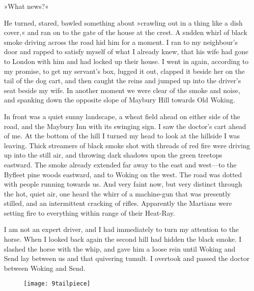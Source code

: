 »What news?«

He turned, stared, bawled something about »crawling out in a thing like a dish cover,« and ran on to the gate of the house at the crest. A sudden whirl of black smoke driving across the road hid him for a moment. I ran to my neighbour's door and rapped to satisfy myself of what I already knew, that his wife had gone to London with him and had locked up their house. I went in again, according to my promise, to get my servant's box, lugged it out, clapped it beside her on the tail of the dog cart, and then caught the reins and jumped up into the driver's seat beside my wife. In another moment we were clear of the smoke and noise, and spanking down the opposite slope of Maybury Hill towards Old Woking.

In front was a quiet sunny landscape, a wheat field ahead on either side of the road, and the Maybury Inn with its swinging sign. I saw the doctor's cart ahead of me. At the bottom of the hill I turned my head to look at the hillside I was leaving. Thick streamers of black smoke shot with threads of red fire were driving up into the still air, and throwing dark shadows upon the green treetops eastward. The smoke already extended far away to the east and west—to the Byfleet pine woods eastward, and to Woking on the west. The road was dotted with people running towards us. And very faint now, but very distinct through the hot, quiet air, one heard the whirr of a machine-gun that was presently stilled, and an intermittent cracking of rifles. Apparently the Martians were setting fire to everything within range of their Heat-Ray.

I am not an expert driver, and I had immediately to turn my attention to the horse. When I looked back again the second hill had hidden the black smoke. I slashed the horse with the whip, and gave him a loose rein until Woking and Send lay between us and that quivering tumult. I overtook and passed the doctor between Woking and Send.

\begin{figure}[b!]
\centering
\texttt{[image: 9tailpiece]}
\end{figure}

